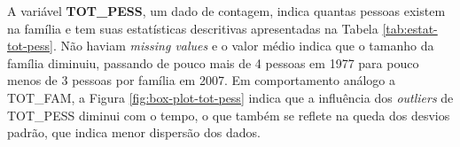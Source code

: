 \begin{table}[htb]
\centering

\end{table}

A variável \textbf{TOT_PESS}, um dado de contagem, indica quantas pessoas existem na família e tem suas estatísticas descritivas apresentadas na Tabela \ref{tab:estat-tot-pess}. Não haviam \textit{missing values} e o valor médio indica que o tamanho da família diminuiu, passando de pouco mais de 4 pessoas em 1977 para pouco menos de 3 pessoas por família em 2007.
Em comportamento análogo a TOT_FAM, a Figura \ref{fig:box-plot-tot-pess} indica que a influência dos \textit{outliers} de TOT_PESS diminui com o tempo, o que também se reflete na queda dos desvios padrão, que indica menor dispersão dos dados.

